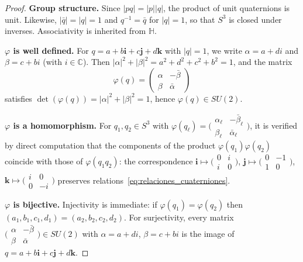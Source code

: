 \begin{proof}
\textbf{Group structure.} Since $|pq| = |p||q|$, the product of unit quaternions is unit. Likewise, $|\bar{q}| = |q| = 1$ and $q^{-1} = \bar{q}$ for $|q| = 1$, so that $S^3$ is closed under inverses. Associativity is inherited from $\mathbb{H}$.

\textbf{$\varphi$ is well defined.} For $q = a + b\mathbf{i} + c\mathbf{j} + d\mathbf{k}$ with $|q| = 1$, we write $\alpha = a + di$ and $\beta = c + bi$ (with $i \in \mathbb{C}$). Then $|\alpha|^2 + |\beta|^2 = a^2 + d^2 + c^2 + b^2 = 1$, and the matrix
\[
\varphi(q) = \begin{pmatrix} \alpha & -\bar{\beta} \\ \beta & \bar{\alpha} \end{pmatrix}
\]
satisfies $\det(\varphi(q)) = |\alpha|^2 + |\beta|^2 = 1$, hence $\varphi(q) \in SU(2)$.

\textbf{$\varphi$ is a homomorphism.} For $q_1, q_2 \in S^3$ with $\varphi(q_\ell) = \bigl(\begin{smallmatrix} \alpha_\ell & -\bar{\beta}_\ell \\ \beta_\ell & \bar{\alpha}_\ell \end{smallmatrix}\bigr)$, it is verified by direct computation that the components of the product $\varphi(q_1)\varphi(q_2)$ coincide with those of $\varphi(q_1 q_2)$: the correspondence $\mathbf{i} \mapsto \bigl(\begin{smallmatrix} 0 & i \\ i & 0 \end{smallmatrix}\bigr)$, $\mathbf{j} \mapsto \bigl(\begin{smallmatrix} 0 & -1 \\ 1 & 0 \end{smallmatrix}\bigr)$, $\mathbf{k} \mapsto \bigl(\begin{smallmatrix} i & 0 \\ 0 & -i \end{smallmatrix}\bigr)$ preserves relations~\eqref{eq:relaciones_cuaterniones}.

\textbf{$\varphi$ is bijective.} Injectivity is immediate: if $\varphi(q_1) = \varphi(q_2)$ then $(a_1, b_1, c_1, d_1) = (a_2, b_2, c_2, d_2)$. For surjectivity, every matrix $\bigl(\begin{smallmatrix} \alpha & -\bar{\beta} \\ \beta & \bar{\alpha} \end{smallmatrix}\bigr) \in SU(2)$ with $\alpha = a + di$, $\beta = c + bi$ is the image of $q = a + b\mathbf{i} + c\mathbf{j} + d\mathbf{k}$.
\end{proof}


